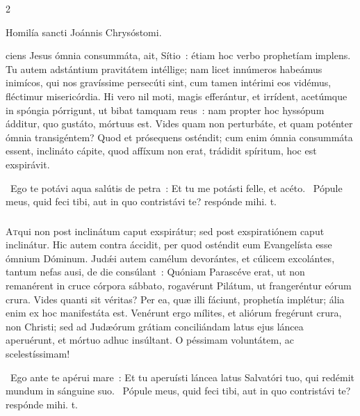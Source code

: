 \documentclass[9pt,twoside]{extarticle}
\begin{document}
\begin{multicols}{2}
\begin{center}Homilía sancti Joánnis Chrysóstomi.\\
\end{center}
ciens Jesus ómnia consummáta, ait, Sítio~: étiam hoc verbo prophetíam implens. Tu autem adstántium pravitátem intéllige; nam licet innúmeros habeámus inimícos, qui nos gravíssime persecúti sint, cum tamen intérimi eos vidémus, fléctimur misericórdia. Hi vero nil moti, magis efferántur, et irrídent, acetúmque in spóngia pórrigunt, ut bibat tamquam reus~: nam propter hoc hyssópum ádditur, quo gustáto, mórtuus est. Vides quam non perturbáte, et quam poténter ómnia transigéntem? Quod et prósequens osténdit; cum enim ómnia consummáta essent, inclináto cápite, quod affíxum non erat, trádidit spíritum, hoc est exspirávit.

\begin{tightlist}{}
\item {}~Ego te potávi aqua salútis de petra~: \textred{*} Et tu me potásti felle, et acéto. ~Pópule meus, quid feci tibi, aut in quo contristávi te? respónde mihi. t.
\end{tightlist}

\subsubsection*{\center{}}
\lettrine{A}tqui non post inclinátum caput exspirátur; sed post exspiratiónem caput inclinátur. Hic autem contra áccidit, per quod osténdit eum Evangelísta esse ómnium Dóminum. Judǽi autem camélum devorántes, et cúlicem excolántes, tantum nefas ausi, de die consúlant~: Quóniam Parascéve erat, ut non remanérent in cruce córpora sábbato, rogavérunt Pilátum, ut frangeréntur eórum crura. Vides quanti sit véritas? Per ea, quæ illi fáciunt, prophetía implétur; ália enim ex hoc manifestáta est. Venérunt ergo mílites, et aliórum fregérunt crura, non Christi; sed ad Judæórum grátiam conciliándam latus ejus láncea aperuérunt, et mórtuo adhuc insúltant. O péssimam voluntátem, ac scelestíssimam!

\begin{tightlist}{}
\item {}~Ego ante te apérui mare~: \textred{*} Et tu aperuísti láncea latus Salvatóri tuo, qui redémit mundum in sánguine suo. ~Pópule meus, quid feci tibi, aut in quo contristávi te? respónde mihi. t.
\end{tightlist}


\end{multicols}
\end{document}
